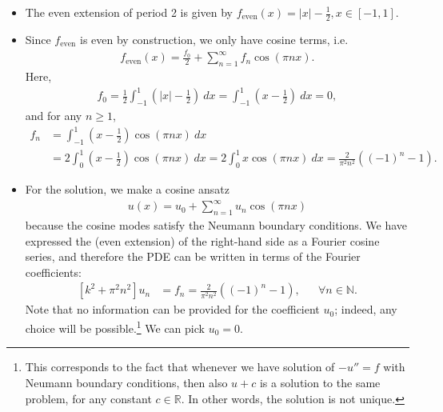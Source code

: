 \documentclass[11pt]{article}
\begin{document}
\begin{solution}
    \begin{itemize}
        \item The even extension of period 2 is given by $f_{\text{even}}(x) = |x| - \frac 1 2, x \in [-1, 1]$.
        \item Since $f_{\text{even}}$ is even by construction, we only have cosine terms, i.e.
        \begin{align*}
            f_{\text{even}}(x) = \frac{f_0}{2} + \sum_{n=1}^{\infty} f_n \cos(\pi n x)
            .
        \end{align*}
        Here, 
        \begin{align*}
            f_0 = \frac{1}{2} \int_{-1}^{1} (|x| - \frac 1 2) \ dx = \int_{-1}^1 (x - \frac 1 2) \ dx = 0
            ,
        \end{align*}
        and for any $n \geq 1$,
        \begin{align*}
            f_n 
            &
            = 
              \int_{-1}^{1} (x- \frac 1 2) \cos(\pi n x) \ dx 
            \\&
            = 
            2 \int_{ 0}^{1} (x- \frac 1 2) \cos(\pi n x) \ dx 
            = 
            2 \int_{ 0}^{1} x \cos(\pi n x) \ dx 
            = 
            \frac{2}{\pi^2 n^2}\left( (-1)^n - 1 \right) %
            .
        \end{align*}
        \item 
        For the solution, we make a cosine ansatz 
        \begin{align*}
            u(x) = u_0 + \sum_{n=1}^{\infty} u_n \cos(\pi n x)
        \end{align*}
        because the cosine modes satisfy the Neumann boundary conditions. 
        We have expressed the (even extension) of the right-hand side as a Fourier cosine series,
        and therefore the PDE can be written in terms of the Fourier coefficients:
        \begin{align*}
            \left [k^2 + \pi^2 n^2 \right]u_n &= f_n = \frac{2}{\pi^2 n^2}\left( (-1)^n - 1 \right), & & \forall n \in \mathbb{N}.
        \end{align*}
        Note that no information can be provided for the coefficient $u_0$; indeed, any choice will be possible.\footnote{This corresponds to the fact that whenever we have solution of $-u'' = f$ with Neumann boundary conditions, then also $u+c$ is a solution to the same problem, for any constant $c \in \mathbb R$. In other words, the solution is not unique.} We can pick $u_0 = 0$. 
        

\end{itemize}
\end{solution}
\end{document}
